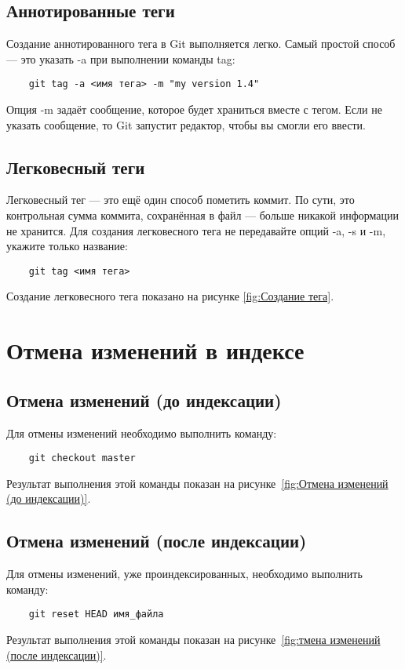 \subsection{Аннотированные теги}
Создание аннотированного тега в Git выполняется легко.
Самый простой способ --- это указать -a при выполнении команды tag:

\begin{verbatim}
	git tag -a <имя тега> -m "my version 1.4"
\end{verbatim}

Опция -m задаёт сообщение, которое будет храниться вместе с тегом.
Если не указать сообщение, то Git запустит редактор,
чтобы вы смогли его ввести.

\subsection{Легковесный теги}
Легковесный тег --- это ещё один способ пометить коммит.
По сути,
это контрольная сумма коммита, сохранённая в файл --- больше никакой
информации не хранится.
Для создания легковесного тега не передавайте
опций -a, -s и -m, укажите только название:

\begin{verbatim}
	git tag <имя тега>
\end{verbatim}

Создание легковесного тега показано на рисунке \ref{fig:Создание тега}.


\section{Отмена изменений в индексе}
\subsection{Отмена изменений (до индексации)}
Для отмены изменений необходимо выполнить команду:
\begin{verbatim}
	git checkout master
\end{verbatim}
Результат выполнения этой команды показан
на рисунке~\ref{fig:Отмена изменений (до индексации)}.


\subsection{Отмена изменений (после индексации)}
Для отмены изменений, уже проиндексированных, необходимо выполнить команду:
\begin{verbatim}
	git reset HEAD имя_файла
\end{verbatim}
Результат выполнения этой команды показан на рисунке~\ref{fig:тмена изменений (после индексации)}.

